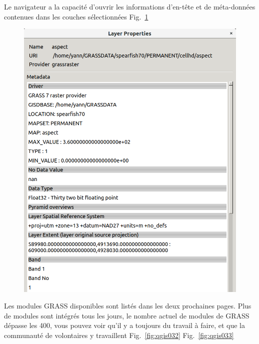 Le navigateur a la capacit\'e d'ouvrir les informations d'en-t\^ete et de m\'eta-donn\'ees contenues dans les couches s\'electionn\'ees Fig.~\ref{fig:qgis031}

\begin{figure}[htbp]
   \centering
   \includegraphics[scale=0.22]{qgis031.png}
   \caption{}
   \label{fig:qgis031}
\end{figure}

Les modules GRASS disponibles sont list\'es dans les deux prochaines pages. Plus de modules sont int\'egr\'es tous les jours, le nombre actuel de modules de GRASS d\'epasse les 400, vous pouvez voir qu'il y a toujours du travail \`a faire, et que la communaut\'e de volontaires y travaillent Fig.~\ref{fig:qgis032} Fig.~\ref{fig:qgis033}

